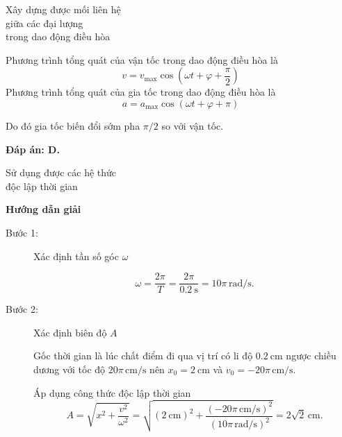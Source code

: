 \begin{dang}{Xây dựng được mối liên hệ\\ giữa các đại lượng\\ trong dao động điều hòa}
{		Phương trình tổng quát của vận tốc trong dao động điều hòa là $$v=v_\text{max}\cos \left( \omega t+\varphi+\dfrac{\pi}{2}\right)$$
		Phương trình tổng quát của gia tốc trong dao động điều hòa là $$a=a_\text{max}\cos \left( \omega t+\varphi+ \pi\right)$$
		
		Do đó gia tốc biến đổi sớm pha $\pi / 2$ so với vận tốc.
		
		\textbf{Đáp án: D.}
	}
	
\end{dang}
\begin{dang}{Sử dụng được các hệ thức\\ độc lập thời gian}
	{\begin{center}
			\textbf{Hướng dẫn giải}
		\end{center}
		
		\begin{description}
			\item[Bước 1:] Xác định tần số góc $\omega$
			
			\begin{equation*}
				\omega =\frac{2\pi }{T}=\frac{2\pi }{\SI{0,2}{\second}}=10\pi \,\text{rad/s}.
			\end{equation*}
			
			\item[Bước 2:] Xác định biên độ $A$
			
			Gốc thời gian là lúc chất điểm đi qua vị trí có li độ $\SI{0,2}{\centi\meter}$ ngược chiều dương với tốc độ $20\pi\, \text{cm/s}$ nên $x_0=\SI{2}{\centi\meter}$ và $v_0=-20\pi\, \text{cm/s}$.
			
			Áp dụng công thức độc lập thời gian
			\begin{equation*}
				A=\sqrt{x^2+\dfrac{v^2}{\omega ^2}}=\sqrt{(\SI{2}{\centi\meter})^2+\dfrac{(-20\pi\, \text{cm/s} )^2}{(10\pi \,\text{rad/s} )^2}}=2\sqrt{2}\,\text{cm}.
			\end{equation*}
			

\end{description}}
\end{dang}
